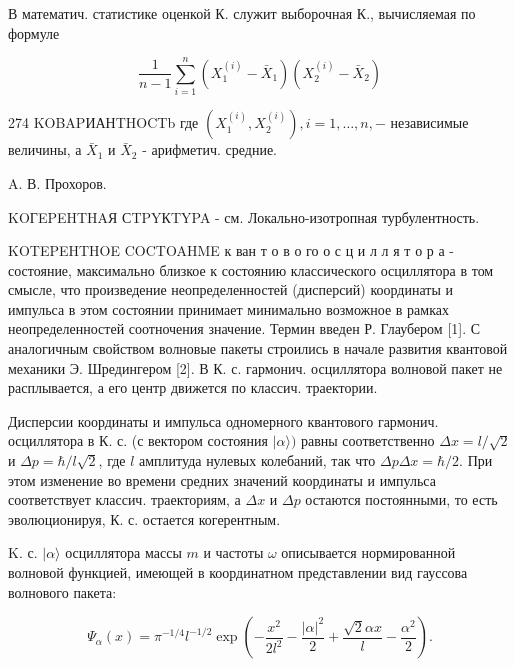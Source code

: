 \documentclass[10pt]{article}
\begin{document}
В математич. статистике оценкой К. служит выборочная К., вычисляемая по формуле



\[

\frac{1}{n-1} \sum_{i=1}^{n}\left(X_{1}^{(i)}-\bar{X}_{1}\right)\left(X_{2}^{(i)}-\bar{X}_{2}\right)

\]



274 KOBAPИАНTHOCTb где $\left(X_{1}^{(i)}, X_{2}^{(i)}\right), i=1, \ldots, n,-$ независимые величины, а $\bar{X}_{1}$ и $\bar{X}_{2}$ - арифметич. средние.



A. В. Прохоров.



KOГEPEHTHAЯ СTPYКTYPA - см. Локально-изотропная турбулентность.



KOTEPEHTHOE COCTOAHME к ван т о в о го о с ц и л л я т о р а - состояние, максимально близкое к состоянию классического осциллятора в том смысле, что произведение неопределенностей (дисперсий) координаты и импульса в этом состоянии принимает минимально возможное в рамках неопределенностей соотночения значение. Термин введен Р. Глаубером [1]. С аналогичным свойством волновые пакеты строились в начале развития квантовой механики Э. Шредингером [2]. В К. с. гармонич. осциллятора волновой пакет не расплывается, а его центр движется по классич. траектории.



Дисперсии координаты и импульса одномерного квантового гармонич. осциллятора в К. с. (с вектором состояния $|\alpha\rangle)$ равны соответственно $\Delta x=l / \sqrt{2}$ и $\Delta p=\hbar / l \sqrt{2}$, где $l$ амплитуда нулевых колебаний, так что $\Delta p \Delta x=\hbar / 2$. При этом изменение во времени средних значений координаты и импульса соответствует классич. траекториям, а $\Delta x$ и $\Delta p$ остаются постоянными, то есть эволюционируя, К. с. остается когерентным.



K. с. $|\alpha\rangle$ осциллятора массы $m$ и частоты $\omega$ описывается нормированной волновой функцией, имеющей в координатном представлении вид гауссова волнового пакета:



\[

\Psi_{\alpha}(x)=\pi^{-1 / 4} l^{-1 / 2} \exp \left(-\frac{x^{2}}{2 l^{2}}-\frac{|\alpha|^{2}}{2}+\frac{\sqrt{2} \alpha x}{l}-\frac{\alpha^{2}}{2}\right) .

\]
\end{document}
